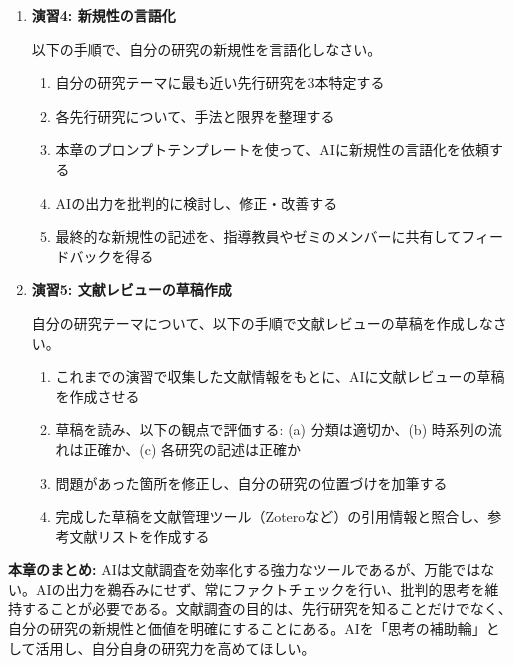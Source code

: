 \begin{enumerate}
\item \textbf{演習4: 新規性の言語化}

以下の手順で、自分の研究の新規性を言語化しなさい。

\begin{enumerate}
\item 自分の研究テーマに最も近い先行研究を3本特定する
\item 各先行研究について、手法と限界を整理する
\item 本章のプロンプトテンプレートを使って、AIに新規性の言語化を依頼する
\item AIの出力を批判的に検討し、修正・改善する
\item 最終的な新規性の記述を、指導教員やゼミのメンバーに共有してフィードバックを得る
\end{enumerate}

\item \textbf{演習5: 文献レビューの草稿作成}

自分の研究テーマについて、以下の手順で文献レビューの草稿を作成しなさい。

\begin{enumerate}
\item これまでの演習で収集した文献情報をもとに、AIに文献レビューの草稿を作成させる
\item 草稿を読み、以下の観点で評価する: (a) 分類は適切か、(b) 時系列の流れは正確か、(c) 各研究の記述は正確か
\item 問題があった箇所を修正し、自分の研究の位置づけを加筆する
\item 完成した草稿を文献管理ツール（Zoteroなど）の引用情報と照合し、参考文献リストを作成する
\end{enumerate}
\end{enumerate}

\vspace{5mm}
\begin{screen}
\textbf{本章のまとめ:} AIは文献調査を効率化する強力なツールであるが、万能ではない。AIの出力を鵜呑みにせず、常にファクトチェックを行い、批判的思考を維持することが必要である。文献調査の目的は、先行研究を知ることだけでなく、自分の研究の新規性と価値を明確にすることにある。AIを「思考の補助輪」として活用し、自分自身の研究力を高めてほしい。
\end{screen}
